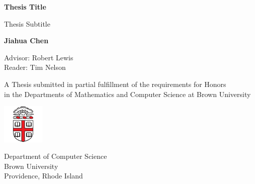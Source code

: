
\begin{titlepage}
    \begin{center}
        \vspace*{1cm}
 
        \textbf{Thesis Title}
 
        \vspace{0.5cm}
         Thesis Subtitle
             
        \vspace{1.5cm}
 
        \textbf{Jiahua Chen}

        \vspace{1.5em}
        Advisor: Robert Lewis \\
        Reader: Tim Nelson
 
        \vfill
             
        A Thesis submitted in partial fulfillment of the requirements for Honors \\
        in the Departments of Mathematics and Computer Science at Brown University
             
        \vspace{3em}
      
        \includegraphics[width=0.15\textwidth]{images/brown-logo.png}
        \vspace{1em}
             
        Department of Computer Science\\
        Brown University\\
        Providence, Rhode Island\\
        \thedate
    \end{center}
 \end{titlepage}
 